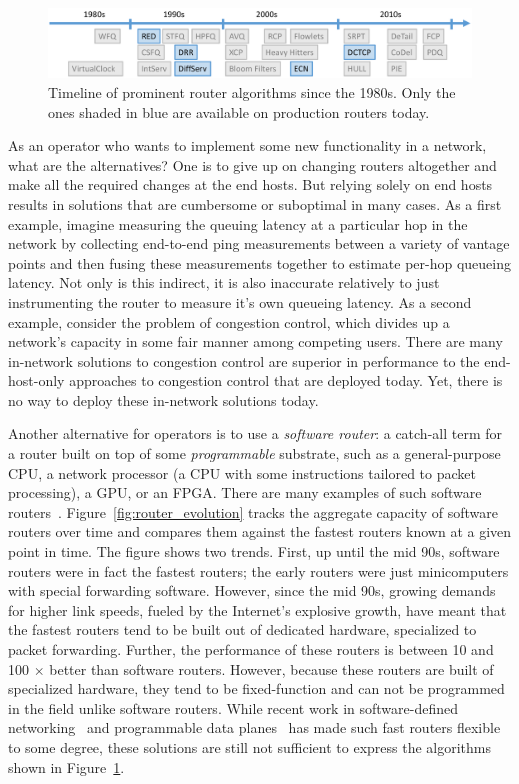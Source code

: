 \begin{figure}
\centering
\includegraphics[width=\columnwidth]{router_alg_timeline.pdf}
\caption{Timeline of prominent router algorithms since the 1980s. Only the ones shaded in blue are available on production routers today.}
\label{fig:router_algos}
\end{figure}

As an operator who wants to implement some new functionality in a network, what
are the alternatives? One is to give up on changing routers altogether and make
all the required changes at the end hosts. But relying solely on end hosts
results in solutions that are cumbersome or suboptimal in many cases. As a
first example, imagine measuring the queuing latency at a particular hop in the
network by collecting end-to-end ping measurements between a variety of vantage
points and then fusing these measurements together to estimate per-hop queueing
latency. Not only is this indirect, it is also inaccurate relatively to just
instrumenting the router to measure it's own queueing latency. As a second
example, consider the problem of congestion control, which divides up a
network's capacity in some fair manner among competing users. There are many
in-network solutions to congestion control are superior in performance to the
end-host-only approaches to congestion control that are deployed today. Yet,
there is no way to deploy these in-network solutions today.

Another alternative for operators is to use a \textit{software router}: a
catch-all term for a router built on top of some \textit{programmable}
substrate, such as a general-purpose CPU, a network processor (a CPU with some
instructions tailored to packet processing), a GPU, or an FPGA. There are many
examples of such software routers~\cite{click, routebricks, netfpga,
packetshader, ixp4xx, ixp2800}. Figure~\ref{fig:router_evolution} tracks the aggregate
capacity of software routers over time and compares them against the fastest
routers known at a given point in time. The figure shows two trends. First, up
until the mid 90s, software routers were in fact the fastest routers; the early
routers were just minicomputers with special forwarding software. However,
since the mid 90s, growing demands for higher link speeds, fueled by the
Internet's explosive growth, have meant that the fastest routers tend to be
built out of dedicated hardware, specialized to packet forwarding. Further, the
performance of these routers is between 10 and 100 $\times$ better than
software routers. However, because these routers are built of specialized
hardware, they tend to be fixed-function and can not be programmed in the field
unlike software routers. While recent work in software-defined
networking~\cite{openflow} and programmable data planes~\cite{rmt, flexpipe,
xpliant, tofino} has made such fast routers flexible to some degree, these
solutions are still not sufficient to express the algorithms shown in
Figure~\ref{fig:router_algos}.

